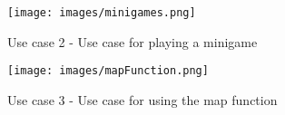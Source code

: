 \begin{figure}[!h]
    \centering
    \texttt{[image: images/minigames.png]}
    \caption{Use case 2 - Use case for playing a minigame}
    \label{fig:use case 2}
\end{figure}

\begin{figure}[!h]
    \centering
    \texttt{[image: images/mapFunction.png]}
    \caption{Use case 3 - Use case for using the map function}
    \label{fig:use case 3}
\end{figure}


\begin{comment}
Alle figurene kan refereres til ved å bruke label: \ref{fig: xxx}. Eks: "As you ‰ can see in the figure \ref{fig:MVC}, The MVC...()"
\end{comment}


